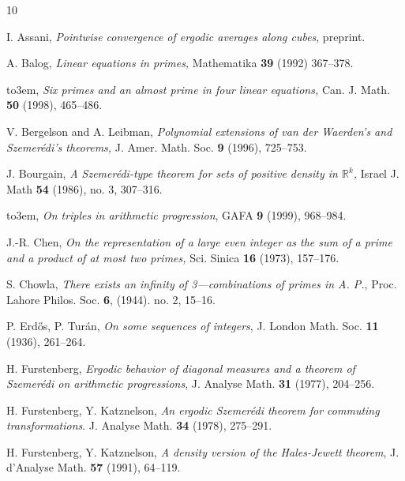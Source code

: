 \documentclass[12pt,a4paper,reqno]{amsart}
\numberwithin{equation}{section}
\theoremstyle{plain}
\theoremstyle{definition}
\def\emph#1{{\it #1}}
\def\textbf#1{{\bf #1}}
\begin{document}
\providecommand{\bysame}{\leavevmode\hbox to3em{\hrulefill}\thinspace}
\providecommand{\MR}{\relax\ifhmode\unskip\space\fi MR }
\providecommand{\MRhref}[2]{%
  \href{http://www.ams.org/mathscinet-getitem?mr=#1}{#2}
}
\providecommand{\href}[2]{#2}
\begin{thebibliography}{10}

I. Assani, \emph{Pointwise convergence of ergodic averages along cubes}, preprint.

 A. Balog, \emph{Linear equations in primes,} Mathematika \textbf{39} (1992) 367--378.

 \bysame, \emph{Six primes and an almost prime in four linear equations,} Can. J. Math. \textbf{50} (1998), 465--486.

 V. Bergelson and A. Leibman, \emph{Polynomial extensions of van der Waerden's and Szemer\'edi's theorems,} J. Amer. Math. Soc. \textbf{9} (1996), 725--753.

 J. Bourgain, \emph{A Szemer\'edi-type theorem for sets of positive density in $\mathbb{R}^k$,} Israel J. Math \textbf{54} (1986), no. 3, 307--316.

\bysame, \emph{On triples in arithmetic progression}, GAFA \textbf{9} (1999), 968--984.

 J.-R. Chen, \emph{On the representation of a large even integer as the sum of a prime and a product of at most two primes,} Sci. Sinica \textbf{16} (1973), 157--176.

S. Chowla, \emph{There exists an infinity of 3---combinations of primes in A. P.},
 Proc. Lahore Philos. Soc. \textbf{6}, (1944). no. 2, 15--16.

P. Erd\H{o}s, P. Tur\'an, \emph{On some sequences of integers}, J. London Math. Soc. \textbf{11} (1936), 261--264.

H. Furstenberg, \emph{Ergodic behavior of diagonal measures and a theorem of Szemer\'edi on arithmetic progressions}, J. Analyse Math. \textbf{31} (1977), 204--256.

H. Furstenberg, Y. Katznelson, \emph{An ergodic Szemer\'edi theorem for commuting transformations}. J. Analyse Math. \textbf{34} (1978), 275--291.

H. Furstenberg, Y. Katznelson, \emph{A density version of the Hales-Jewett theorem}, J. d'Analyse Math. \textbf{57} (1991), 64--119.


\end{thebibliography}
\end{document}
